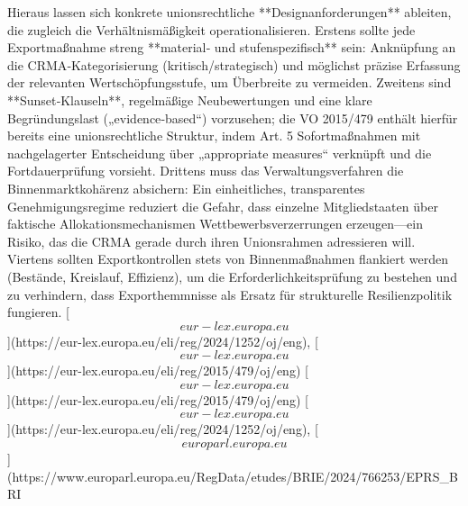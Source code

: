 \documentclass[12pt,a4paper,oneside]{book} %
\begin{document}
Hieraus lassen sich konkrete unionsrechtliche **Designanforderungen** ableiten, die zugleich die Verhältnismäßigkeit operationalisieren. Erstens sollte jede Exportmaßnahme streng **material‑ und stufenspezifisch** sein: Anknüpfung an die CRMA‑Kategorisierung (kritisch/strategisch) und möglichst präzise Erfassung der relevanten Wertschöpfungsstufe, um Überbreite zu vermeiden.  Zweitens sind **Sunset‑Klauseln**, regelmäßige Neubewertungen und eine klare Begründungslast („evidence‑based“) vorzusehen; die VO 2015/479 enthält hierfür bereits eine unionsrechtliche Struktur, indem Art. 5 Sofortmaßnahmen mit nachgelagerter Entscheidung über „appropriate measures“ verknüpft und die Fortdauerprüfung vorsieht.  Drittens muss das Verwaltungsverfahren die Binnenmarktkohärenz absichern: Ein einheitliches, transparentes Genehmigungsregime reduziert die Gefahr, dass einzelne Mitgliedstaaten über faktische Allokationsmechanismen Wettbewerbsverzerrungen erzeugen—ein Risiko, das die CRMA gerade durch ihren Unionsrahmen adressieren will.  Viertens sollten Exportkontrollen stets von Binnenmaßnahmen flankiert werden (Bestände, Kreislauf, Effizienz), um die Erforderlichkeitsprüfung zu bestehen und zu verhindern, dass Exporthemmnisse als Ersatz für strukturelle Resilienzpolitik fungieren. [\[eur-lex.europa.eu\]](https://eur-lex.europa.eu/eli/reg/2024/1252/oj/eng), [\[eur-lex.europa.eu\]](https://eur-lex.europa.eu/eli/reg/2015/479/oj/eng) [\[eur-lex.europa.eu\]](https://eur-lex.europa.eu/eli/reg/2015/479/oj/eng) [\[eur-lex.europa.eu\]](https://eur-lex.europa.eu/eli/reg/2024/1252/oj/eng), [\[europarl.europa.eu\]](https://www.europarl.europa.eu/RegData/etudes/BRIE/2024/766253/EPRS_BRI%
\end{document}
